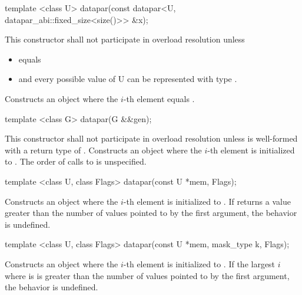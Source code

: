 \begin{itemdecl}
template <class U> datapar(const datapar<U, datapar_abi::fixed_size<size()>> &x);
\end{itemdecl}
\begin{itemdescr}
  \pnum\remarks This constructor shall not participate in overload resolution unless
  \begin{itemize}
    \item {} equals \fixedsizescoped{}
    \item and every possible value of \type U can be represented with type .
  \end{itemize}
  \pnum\effects Constructs an object where the $i$-th element equals  \foralli.
\end{itemdescr}

\begin{itemdecl}
template <class G> datapar(G &&gen);
\end{itemdecl}
\begin{itemdescr}
  \pnum\remarks This constructor shall not participate in overload resolution unless  is well-formed with a return type of .
  \pnum\effects Constructs an object where the $i$-th element is initialized to .
  \pnum\remarks The order of calls to  is unspecified.%
\end{itemdescr}

\begin{itemdecl}
template <class U, class Flags> datapar(const U *mem, Flags);
\end{itemdecl}
\begin{itemdescr}
  \pnum\effects Constructs an object where the $i$-th element is initialized to  \foralli.
  \pnum\remarks If  returns a value greater than the number of values pointed to by the first argument, the behavior is undefined.
\end{itemdescr}

\begin{itemdecl}
template <class U, class Flags> datapar(const U *mem, mask_type k, Flags);
\end{itemdecl}
\begin{itemdescr}
  \pnum\effects Constructs an object where the $i$-th element is initialized to  \foralli.
  \pnum\remarks If the largest $i$ where  is \true is greater than the number of values pointed to by the first argument, the behavior is undefined.
\end{itemdescr}

